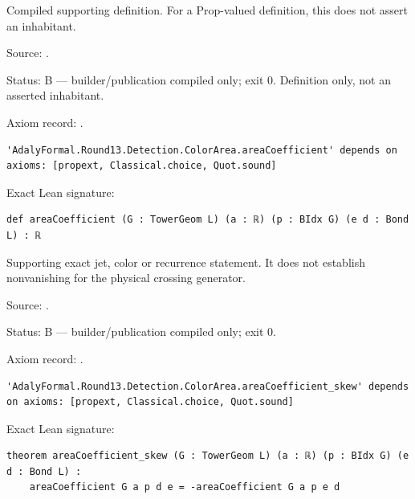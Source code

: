 \begin{definition}[bp-536]
\label{bp-536}
\leanok
Compiled supporting definition. For a Prop-valued definition, this does not assert an inhabitant.

\par Source: \texttt{}.
\par Status: B — builder/publication compiled only; exit 0. Definition only, not an asserted inhabitant.
\par Axiom record: \texttt{}.
\begin{verbatim}
'AdalyFormal.Round13.Detection.ColorArea.areaCoefficient' depends on axioms: [propext, Classical.choice, Quot.sound]
\end{verbatim}
\par Exact Lean signature:
\begin{verbatim}
def areaCoefficient (G : TowerGeom L) (a : ℝ) (p : BIdx G) (e d : Bond L) : ℝ
\end{verbatim}
\end{definition}

\begin{theorem}[bp-537]
\label{bp-537}
\leanok
Supporting exact jet, color or recurrence statement. It does not establish nonvanishing for the physical crossing generator.

\par Source: \texttt{}.
\par Status: B — builder/publication compiled only; exit 0.
\par Axiom record: \texttt{}.
\begin{verbatim}
'AdalyFormal.Round13.Detection.ColorArea.areaCoefficient_skew' depends on axioms: [propext, Classical.choice, Quot.sound]
\end{verbatim}
\par Exact Lean signature:
\begin{verbatim}
theorem areaCoefficient_skew (G : TowerGeom L) (a : ℝ) (p : BIdx G) (e d : Bond L) :
    areaCoefficient G a p d e = -areaCoefficient G a p e d
\end{verbatim}
\end{theorem}

